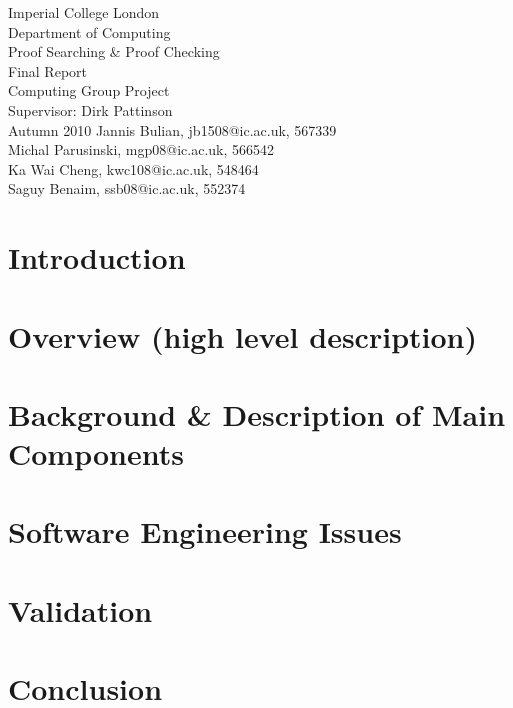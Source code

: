 \documentclass[12pt,a4paper]{scrartcl}
\begin{document}
\thispagestyle{empty}
\begin{titlepage}
  \begin{center}
    \vspace*{\fill}
            {{\Large Imperial College London\\ Department of Computing\\}}
            \vfill {{\Huge Proof Searching \& Proof Checking \\
                \vspace{0.2cm}
                     Final Report}}\\
            \vfill {{\large Computing Group Project\\ 
                Supervisor: Dirk Pattinson\\ Autumn 2010}}
            \vfill {Jannis Bulian, jb1508@ic.ac.uk, 567339 \\
                    Michal Parusinski, mgp08@ic.ac.uk, 566542 \\
                    Ka Wai Cheng, kwc108@ic.ac.uk, 548464\\
                    Saguy Benaim, ssb08@ic.ac.uk, 552374}
  \end{center}
\end{titlepage}

\newpage

\tableofcontents
\thispagestyle{empty}

\newpage

\section{Introduction}


\section{Overview (high level description)}


\section{Background \& Description of Main Components}



\section{Software Engineering Issues}



\section{Validation}


\section{Conclusion}


\newpage
\singlespacing
\appendix
\appendixpage


\newpage
\singlespacing



\end{document}
